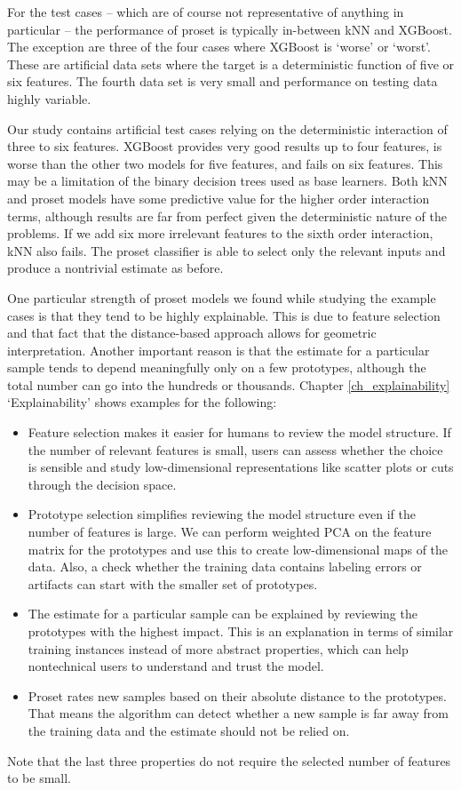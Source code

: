 %
For the test cases -- which are of course not representative of anything in particular -- the performance of proset is typically in-between kNN and XGBoost.
The exception are three of the four cases where XGBoost is `worse' or `worst'.
These are artificial data sets where the target is a deterministic function of five or six features.
The fourth data set is very small and performance on testing data highly variable.\par
%
Our study contains artificial test cases relying on the deterministic interaction of three to six features.
XGBoost provides very good results up to four features, is worse than the other two models for five features, and fails on six features.
This may be a limitation of the binary decision trees used as base learners.
Both kNN and proset models have some predictive value for the higher order interaction terms, although results are far from perfect given the deterministic nature of the problems.
If we add six more irrelevant features to the sixth order interaction, kNN also fails.
The proset classifier is able to select only the relevant inputs and produce a nontrivial estimate as before.\par
%
One particular strength of proset models we found while studying the example cases is that they tend to be highly explainable.
This is due to feature selection and that fact that the distance-based approach allows for geometric interpretation.
Another important reason is that the estimate for a particular sample tends to depend meaningfully only on a few prototypes, although the total number can go into the hundreds or thousands.
Chapter \ref{ch_explainability} `Explainability' shows examples for the following:
%
\begin{itemize}
\item Feature selection makes it easier for humans to review the model structure.
If the number of relevant features is small, users can assess whether the choice is sensible and study low-dimensional representations like scatter plots or cuts through the decision space.
%
\item Prototype selection simplifies reviewing the model structure even if the number of features is large.
We can perform weighted PCA on the feature matrix for the prototypes and use this to create low-dimensional maps of the data.
Also, a check whether the training data contains labeling errors or artifacts can start with the smaller set of prototypes.
%
\item The estimate for a particular sample can be explained by reviewing the prototypes with the highest impact.
This is an explanation in terms of similar training instances instead of more abstract properties, which can help nontechnical users to understand and trust the model.
%
\item Proset rates new samples based on their absolute distance to the prototypes.
That means the algorithm can detect whether a new sample is far away from the training data and the estimate should not be relied on.
\end{itemize}
%
Note that the last three properties do not require the selected number of features to be small.
%
